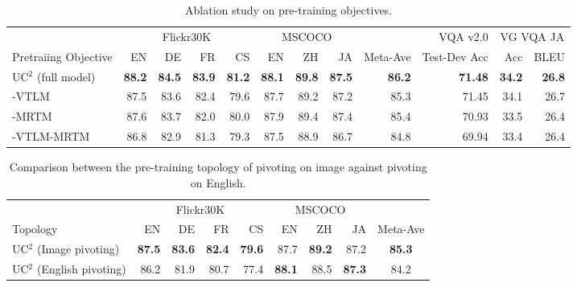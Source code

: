 \documentclass[final]{cvpr}
\newcommand{\luowei}[1]{\textcolor{cyan}{\small{\bf [Luowei: #1 ]}}}
\newcommand{\mingyang}[1]{\textcolor{brown}{\small{\bf [Mingyang: #1 ]}}}
\begin{document}
\begin{table*}[!]
\centering
\small
\begin{tabular}{l|rrrrrrrr|rrr}
\hline
& \multicolumn{4}{c}{Flickr30K} & \multicolumn{3}{c}{MSCOCO} &  & VQA v2.0 & \multicolumn{2}{c}{VG VQA JA}\\
Pretraiing Objective  & EN  & DE   & FR   & CS    & EN & ZH   & JA    & Meta-Ave  & Test-Dev Acc & Acc & BLEU\\ 
\hline
UC${^2}$ (full model)   & \textbf{88.2} & \textbf{84.5} &  \textbf{83.9} & \textbf{81.2}    &  \textbf{88.1} & \textbf{89.8} & \textbf{87.5} & \textbf{86.2}  & \textbf{71.48} & \textbf{34.2} & \textbf{26.8}\\ 
\hline
\quad\quad -VTLM & 87.5  & 83.6  & 82.4 & 79.6  & 87.7   & 89.2  & 87.2 & 85.3  & 71.45 & 34.1 & 26.7    
\\
\quad\quad -MRTM & 87.6  & 83.7  & 82.0 & 80.0  & 87.9   & 89.4  & 87.4 & 85.4  & 70.93 & 33.5 & 26.4 
\\
\quad\quad-VTLM-MRTM    & 86.8    & 82.9   & 81.3   & 79.3   & 87.5   & 88.9  & 86.7 & 84.8 & 69.94 & 33.4 & 26.4 \\ \hline
\end{tabular}
\caption{\label{tab:itm_abs} Ablation study on pre-training objectives.}

\end{table*}
\begin{table*}[!]
\centering
\small
\begin{tabular}{l|rrrrrrrc}
\hline
& \multicolumn{4}{c}{Flickr30K} & \multicolumn{3}{c}{MSCOCO} & \\
Topology  & EN  & DE   & FR   & CS    & EN & ZH   & JA    & Meta-Ave  \\ 
\hline
UC${^2}$ (Image pivoting)   & \textbf{87.5} & \textbf{83.6} &  \textbf{82.4} & \textbf{79.6}    &  87.7 & \textbf{89.2} & 87.2 & \textbf{85.3}  \\
\hline
UC${^2}$ (English pivoting)    & 86.2    & 81.9   & 80.7   & 77.4   & \textbf{88.1}   & 88.5  & \textbf{87.3} & 84.2 \\ \hline
\end{tabular}
\caption{\label{tab:img_piv_abs} Comparison between the pre-training topology of pivoting on image against pivoting on English.}
\end{table*}
\end{document}
